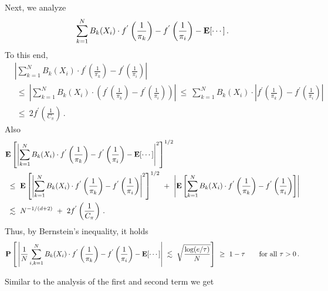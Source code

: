 Next, we analyze 
\begin{gather}
  \sum_{k=1}^{N} 
  B_k(X_i)\cdot
  f^{'}\left( \frac{1}{\pi_k} \right)
  -
  f^{'}\left( \frac{1}{\pi_i} \right)
  -
  \mathbf{E}[\cdots]
  \,.
\end{gather}
To this end,
\begin{align*}
  &
  \left| 
  \sum_{k=1}^{N} 
  B_k(X_i)\cdot
  f^{'}\left( \frac{1}{\pi_k} \right)
  -
  f^{'}\left( \frac{1}{\pi_i} \right)
  \right|
  \\
  &
  \ 
  \le
  \ 
  \left| 
  \sum_{k=1}^{N} 
  B_k(X_i)\cdot
  \left( 
  f^{'}\left( \frac{1}{\pi_k} \right)
  -
  f^{'}\left( \frac{1}{\pi_i} \right)
  \right)
  \right|
  \ 
  \le
  \ 
  \sum_{k=1}^{N} 
  B_k(X_i)\cdot
  \left| 
  f^{'}\left( \frac{1}{\pi_k} \right)
  -
  f^{'}\left( \frac{1}{\pi_i} \right)
  \right|
  \\
  &
  \ 
  \le
  \ 
  2
  f^{'}\left( \frac{1}{C_\pi} \right)
  \,.
\end{align*}
Also
\begin{align*}
  &
  \E
  \left[ 
  \left| 
  \sum_{k=1}^{N} 
  B_k(X_i)\cdot
  f^{'}\left( \frac{1}{\pi_k} \right)
  -
  f^{'}\left( \frac{1}{\pi_i} \right)
  -
  \E[\cdots]
  \right|^2
\right]^{1/2}
\\
  &
  \ 
\le
  \ 
  \E
  \left[ 
  \left| 
  \sum_{k=1}^{N} 
  B_k(X_i)\cdot
  f^{'}\left( \frac{1}{\pi_k} \right)
  -
  f^{'}\left( \frac{1}{\pi_i} \right)
  \right|^2
\right]^{1/2}
  \ 
+
  \ 
\left| 
\E
\left[ 
  \sum_{k=1}^{N} 
  B_k(X_i)\cdot
  f^{'}\left( \frac{1}{\pi_k} \right)
  -
  f^{'}\left( \frac{1}{\pi_i} \right)
\right]
\right|
\\
  &
  \ 
\lesssim
  \ 
N^{-1/(d+2)}
  \ 
+
  \ 
  2
  f^{'}\left( \frac{1}{C_\pi} \right)
  \,.
\end{align*}
Thus, by Bernstein's inequality, it holds
\begin{gather}
   \P
    \left[ 
      \,
      \left| 
      \frac{1}{N}
  \sum_{i,k=1}^{N} 
  B_k(X_i)\cdot
  f^{'}\left( \frac{1}{\pi_k} \right)
  -
  f^{'}\left( \frac{1}{\pi_i} \right)
  -
  \E[\cdots]
      \right|
      \ 
      \lesssim
      \ 
      \sqrt{
        \frac{
        \log (e/\tau)}
      {N}
      }
    \right]
    \ 
    \ge
    \ 
    1-\tau
    \qquad
    \text{for all}\ 
    \tau
    >
    0
    \,.
\end{gather}

Similar to the analysis of the first and second term we get

